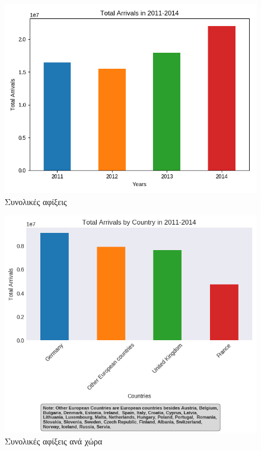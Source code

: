 \documentclass[a4paper]{article}
\begin{document}
\begin{figure}[H]
\centering
\includegraphics[scale=0.7]{total_arrivals} 
\caption{Συνολικές αφίξεις}
\label{fig:total_arrivals}
\end{figure}

\begin{figure}[H]
\centering
\includegraphics[scale=0.7]{total_arrivals_by_country}
\caption{Συνολικές αφίξεις ανά χώρα}
\label{fig:total_arrivals_by_country}
\end{figure}
\end{document}
